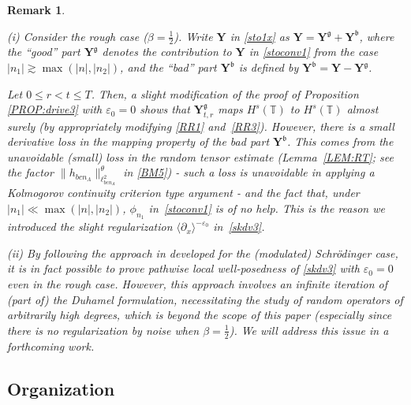 \documentclass[letterpaper, 11pt,  reqno]{amsart}
\newtheorem{remark}[theorem]{Remark}
\newcommand{\1}{\hspace{0.5mm}\textup{I}\hspace{0.5mm}}
\newcommand{\noi}{\noindent}
\newcommand{\T}{\mathbb{T}}
\newcommand{\be}{\beta}
\newcommand{\eps}{\varepsilon}
\newcommand{\dx}{\partial_x}
\newcommand{\ta}{\theta}
\renewcommand{\l}{\ell}
\newcommand{\ges}{\gtrsim}
\newcommand{\jb}[1]
{\langle #1 \rangle}
\newcommand{\Yb}{\YY^{\mathfrak{b}}}
\newcommand{\Yg}{\YY^{\mathfrak{g}}}
\newcommand{\YY}{\mathbf{Y}}
\numberwithin{equation}{section}
\numberwithin{theorem}{section}
\begin{document}
\begin{remark}\label{REM:rough}\rm

(i)
Consider the rough case ($\be = \frac 12$).
Write $\YY$ in \eqref{sto1x} as 
$\YY = \Yg + \Yb$,
where 
the ``good'' part 
$\Yg$ denotes the contribution to $\YY$
in \eqref{stoconv1} from the case $|n_1|\ges \max (|n|, |n_2|)$, 
and 
the ``bad'' part $\Yb$ is defined by 
$\Yb = \YY - \Yg$.

Let $0 \le r < t\le T$.
Then, a slight modification of the proof of Proposition \ref{PROP:drive3}
with $\eps_0 = 0$
shows that $\Yg_{t, r}$
maps $H^s(\T)$ to $H^s(\T)$ almost surely
(by appropriately modifying 
\eqref{RR1} and~\eqref{RR3}).
However, there is a small derivative loss 
 in the mapping property of the bad part $\Yb$.
This comes from the unavoidable (small)
loss in the random tensor estimate (Lemma~\ref{LEM:RT};
see the factor $\| h_{bcn_A} \|_{\l^2_{bcn_A}}^{\ta}$
in \eqref{BM5}) - such a loss is unavoidable
in applying a Kolmogorov continuity criterion type argument
- 
and the fact that, under $|n_1|\ll \max (|n|, |n_2|)$, 
$\phi_{n_1}$ in~\eqref{stoconv1} is of no help.
This is the reason we introduced the slight regularization $\jb{\dx}^{-\eps_0}$
in~\eqref{skdv3}.

\smallskip
%
%


\noi
(ii) By following the approach in \cite{COZ}
developed for the (modulated) Schr\"odinger case, 
it is in fact possible to prove pathwise local well-posedness
of \eqref{skdv3} with $\eps_0 =0$
even in the rough case.
However, this approach involves
an infinite iteration of (part of) the Duhamel formulation,
necessitating
the study  of random operators of arbitrarily high degrees,
which is beyond the scope of this paper
(especially since there is no regularization by noise when $\be = \frac 12$).
We will address this issue in a forthcoming work.


\end{remark}











\subsection{Organization}
\end{document}
